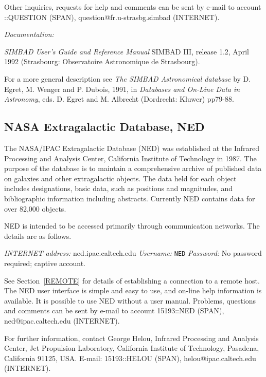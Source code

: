 \documentclass[twoside,11pt,nolof]{starlink}
\begin{document}
Other inquiries, requests for help and comments can be sent by e-mail
to account
::QUESTION (SPAN), question@fr.u-strasbg.simbad
(INTERNET).

\textit{Documentation:}

\textit{SIMBAD User's Guide and Reference Manual} SIMBAD III, release 1.2,
April 1992 (Strasbourg: Observatoire Astronomique de Strasbourg).

For a more general description see \textit{The SIMBAD Astronomical
database} by D. Egret, M. Wenger and P. Dubois, 1991, in \textit{Databases
and On-Line Data in Astronomy}, eds. D. Egret and M. Albrecht
(Dordrecht: Kluwer) pp79-88.

\subsection{NASA Extragalactic Database, NED
}

The NASA/IPAC Extragalactic Database (NED) was established at the
Infrared Processing and Analysis Center, California Institute of
Technology in 1987. The purpose of the database is to maintain a
comprehensive archive of published data on galaxies and other
extragalactic objects. The data held for each object includes
designations, basic data, such as positions and magnitudes, and
bibliographic information including abstracts. Currently NED contains
data for over 82,000 objects.

NED is intended to be accessed primarily through communication networks.
The details are as follows.

\textit{INTERNET address:} ned.ipac.caltech.edu
\newline \textit{Username:} \verb-NED-
\newline \textit{Password:} No password required; captive account.

See Section~\ref{REMOTE} for details of establishing a connection to
a remote host. The NED user interface is simple and easy to use,
and on-line help information is available. It is possible to use NED
without a user manual. Problems, questions and comments can be sent by
e-mail to account 15193::NED (SPAN), ned@ipac.caltech.edu (INTERNET).

For further information, contact George Helou, Infrared Processing and
Analysis Center, Jet Propulsion Laboratory, California Institute of
Technology, Pasadena, California 91125, USA. E-mail: 15193::HELOU
(SPAN), helou@ipac.caltech.edu (INTERNET).
\end{document}
